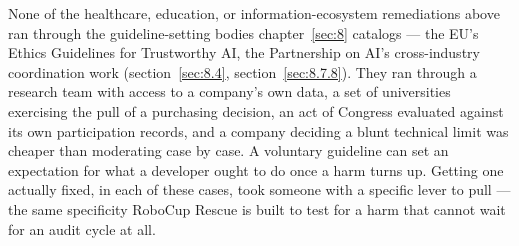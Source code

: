 None of the healthcare, education, or information-ecosystem remediations above ran through the guideline-setting bodies chapter~\ref{sec:8} catalogs — the EU's Ethics Guidelines for Trustworthy AI, the Partnership on AI's cross-industry coordination work (section~\ref{sec:8.4}, section~\ref{sec:8.7.8}). They ran through a research team with access to a company's own data, a set of universities exercising the pull of a purchasing decision, an act of Congress evaluated against its own participation records, and a company deciding a blunt technical limit was cheaper than moderating case by case. A voluntary guideline can set an expectation for what a developer ought to do once a harm turns up. Getting one actually fixed, in each of these cases, took someone with a specific lever to pull — the same specificity RoboCup Rescue is built to test for a harm that cannot wait for an audit cycle at all.
